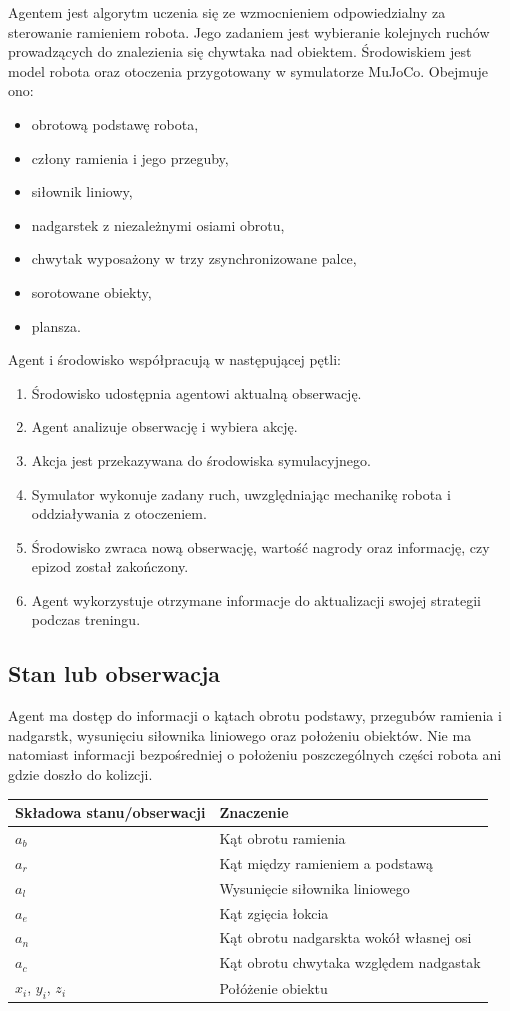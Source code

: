 \documentclass[12pt]{article}
\begin{document}
Agentem jest algorytm uczenia się ze wzmocnieniem odpowiedzialny za sterowanie ramieniem robota. 
Jego zadaniem jest wybieranie kolejnych ruchów prowadzących do znalezienia się chywtaka nad obiektem.
Środowiskiem jest model robota oraz otoczenia przygotowany w symulatorze MuJoCo. Obejmuje ono:
\begin{itemize}
    \item obrotową podstawę robota,
    \item człony ramienia i jego przeguby,
    \item siłownik liniowy,
    \item nadgarstek z niezależnymi osiami obrotu,
    \item chwytak wyposażony w trzy zsynchronizowane palce,
    \item sorotowane obiekty,
    \item plansza.
\end{itemize}
Agent i środowisko współpracują w następującej pętli:
\begin{enumerate}
    \item Środowisko udostępnia agentowi aktualną obserwację.
    \item Agent analizuje obserwację i wybiera akcję.
    \item Akcja jest przekazywana do środowiska symulacyjnego.
    \item Symulator wykonuje zadany ruch, uwzględniając mechanikę robota i oddziaływania z otoczeniem.
    \item Środowisko zwraca nową obserwację, wartość nagrody oraz informację, czy epizod został zakończony.
    \item Agent wykorzystuje otrzymane informacje do aktualizacji swojej strategii podczas treningu.
\end{enumerate}

\subsection{Stan lub obserwacja}

Agent ma dostęp do informacji o kątach obrotu podstawy, przegubów ramienia i nadgarstk, wysunięciu siłownika liniowego oraz położeniu obiektów.
Nie ma natomiast informacji bezpośredniej o położeniu poszczególnych części robota ani gdzie doszło do kolizcji.

\begin{center}
\begin{tabular}{p{}p{}}
\toprule
Składowa stanu/obserwacji & Znaczenie \\
\midrule
$a_b$ & Kąt obrotu ramienia \\
$a_r$ & Kąt między ramieniem a podstawą \\
$a_l$ & Wysunięcie siłownika liniowego \\
$a_e$ & Kąt zgięcia łokcia\\
$a_n$ & Kąt obrotu nadgarskta wokół własnej osi\\
$a_c$ & Kąt obrotu chwytaka względem nadgastak\\
$x_i$, $y_i$, $z_i$ & Połóżenie obiektu\\
\bottomrule
\end{tabular}
\end{center}
\end{document}
